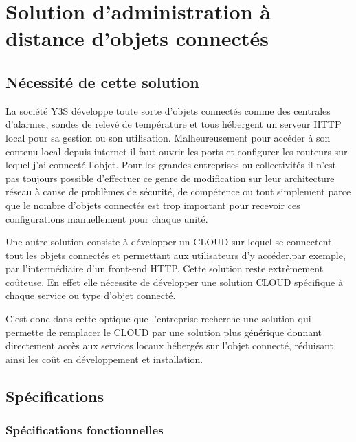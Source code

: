 \chapter{Solution d'administration à distance d'objets connectés}
\label{sec:content}

\section{Nécessité de cette solution}

La société Y3S développe toute sorte d'objets connectés comme des
centrales d'alarmes, sondes de relevé de température et tous hébergent
un serveur HTTP local pour sa gestion ou son utilisation.
Malheureusement pour accéder à son contenu local depuis internet il
faut ouvrir les ports et configurer les routeurs sur lequel j'ai
connecté l'objet. Pour les grandes entreprises ou collectivités il
n'est pas toujours possible d'effectuer ce genre de modification sur
leur architecture réseau à cause de problèmes de sécurité, de
compétence ou tout simplement parce que le nombre d'objets connectés
est trop important pour recevoir ces configurations manuellement pour
chaque unité.

Une autre solution consiste à développer un CLOUD sur lequel se
connectent tout les objets connectés et permettant aux utilisateurs
d'y accéder,par exemple, par l'intermédiaire d'un front-end
HTTP. Cette solution reste extrêmement coûteuse. En effet elle
nécessite de développer une solution CLOUD spécifique à chaque service
ou type d'objet connecté.

C'est donc dans cette optique que l'entreprise recherche une solution
qui permette de remplacer le CLOUD par une solution plus générique
donnant directement accès aux services locaux hébergés sur l'objet
connecté, réduisant ainsi les coût en développement et installation.

\section{Spécifications}

\subsection{Spécifications fonctionnelles}

